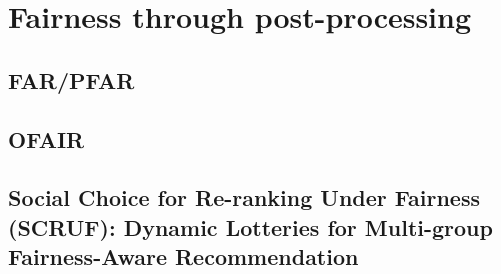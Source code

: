 \chapter{Fairness through post-processing}
\label{fairness_postproc}


\section{FAR/PFAR}

\section{OFAIR}
    
\section{Social Choice for Re-ranking Under Fairness (SCRUF): Dynamic Lotteries for Multi-group Fairness-Aware Recommendation}
    
